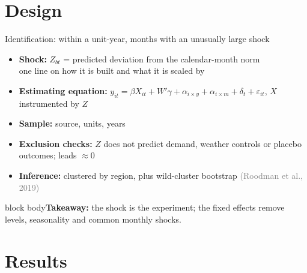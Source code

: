 \documentclass[aspectratio=169,10pt]{beamer}
\newcommand{\takeaway}[1]{\vfill\begin{beamercolorbox}[sep=5pt]{block body}\small\textbf{Takeaway:} #1\end{beamercolorbox}}
\newcommand{\citeg}[1]{\textcolor{gray}{(#1)}}
\begin{document}
\section{Design}

\begin{frame}{Identification: within a unit-year, months with an unusually large shock}
\begin{itemize}
\item \textbf{Shock:} $Z_{bt}$ = predicted deviation from the calendar-month norm\\
  {\small one line on how it is built and what it is scaled by}
\item \textbf{Estimating equation:} $y_{it} = \beta X_{it} + W'\gamma + \alpha_{i\times y} + \alpha_{i\times m} + \delta_t +
  \varepsilon_{it}$, $X$ instrumented by $Z$
\item \textbf{Sample:} source, units, years
\item \textbf{Exclusion checks:} $Z$ does not predict demand, weather controls or placebo outcomes; leads $\approx 0$
\item \textbf{Inference:} clustered by region, plus wild-cluster bootstrap \citeg{Roodman et al., 2019}
\end{itemize}
\takeaway{the shock is the experiment; the fixed effects remove levels, seasonality and common monthly shocks.}
\end{frame}

\section{Results}
\end{document}
